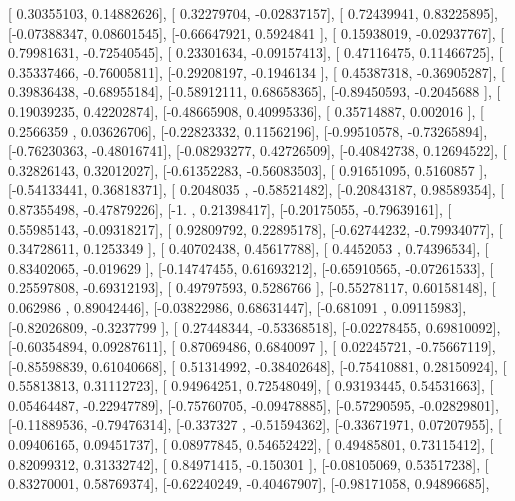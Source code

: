 \documentclass{article}
\begin{document}
       [ 0.30355103,  0.14882626],
       [ 0.32279704, -0.02837157],
       [ 0.72439941,  0.83225895],
       [-0.07388347,  0.08601545],
       [-0.66647921,  0.5924841 ],
       [ 0.15938019, -0.02937767],
       [ 0.79981631, -0.72540545],
       [ 0.23301634, -0.09157413],
       [ 0.47116475,  0.11466725],
       [ 0.35337466, -0.76005811],
       [-0.29208197, -0.1946134 ],
       [ 0.45387318, -0.36905287],
       [ 0.39836438, -0.68955184],
       [-0.58912111,  0.68658365],
       [-0.89450593, -0.2045688 ],
       [ 0.19039235,  0.42202874],
       [-0.48665908,  0.40995336],
       [ 0.35714887,  0.002016  ],
       [ 0.2566359 ,  0.03626706],
       [-0.22823332,  0.11562196],
       [-0.99510578, -0.73265894],
       [-0.76230363, -0.48016741],
       [-0.08293277,  0.42726509],
       [-0.40842738,  0.12694522],
       [ 0.32826143,  0.32012027],
       [-0.61352283, -0.56083503],
       [ 0.91651095,  0.5160857 ],
       [-0.54133441,  0.36818371],
       [ 0.2048035 , -0.58521482],
       [-0.20843187,  0.98589354],
       [ 0.87355498, -0.47879226],
       [-1.        ,  0.21398417],
       [-0.20175055, -0.79639161],
       [ 0.55985143, -0.09318217],
       [ 0.92809792,  0.22895178],
       [-0.62744232, -0.79934077],
       [ 0.34728611,  0.1253349 ],
       [ 0.40702438,  0.45617788],
       [ 0.4452053 ,  0.74396534],
       [ 0.83402065, -0.019629  ],
       [-0.14747455,  0.61693212],
       [-0.65910565, -0.07261533],
       [ 0.25597808, -0.69312193],
       [ 0.49797593,  0.5286766 ],
       [-0.55278117,  0.60158148],
       [ 0.062986  ,  0.89042446],
       [-0.03822986,  0.68631447],
       [-0.681091  ,  0.09115983],
       [-0.82026809, -0.3237799 ],
       [ 0.27448344, -0.53368518],
       [-0.02278455,  0.69810092],
       [-0.60354894,  0.09287611],
       [ 0.87069486,  0.6840097 ],
       [ 0.02245721, -0.75667119],
       [-0.85598839,  0.61040668],
       [ 0.51314992, -0.38402648],
       [-0.75410881,  0.28150924],
       [ 0.55813813,  0.31112723],
       [ 0.94964251,  0.72548049],
       [ 0.93193445,  0.54531663],
       [ 0.05464487, -0.22947789],
       [-0.75760705, -0.09478885],
       [-0.57290595, -0.02829801],
       [-0.11889536, -0.79476314],
       [-0.337327  , -0.51594362],
       [-0.33671971,  0.07207955],
       [ 0.09406165,  0.09451737],
       [ 0.08977845,  0.54652422],
       [ 0.49485801,  0.73115412],
       [ 0.82099312,  0.31332742],
       [ 0.84971415, -0.150301  ],
       [-0.08105069,  0.53517238],
       [ 0.83270001,  0.58769374],
       [-0.62240249, -0.40467907],
       [-0.98171058,  0.94896685],
\end{document}
